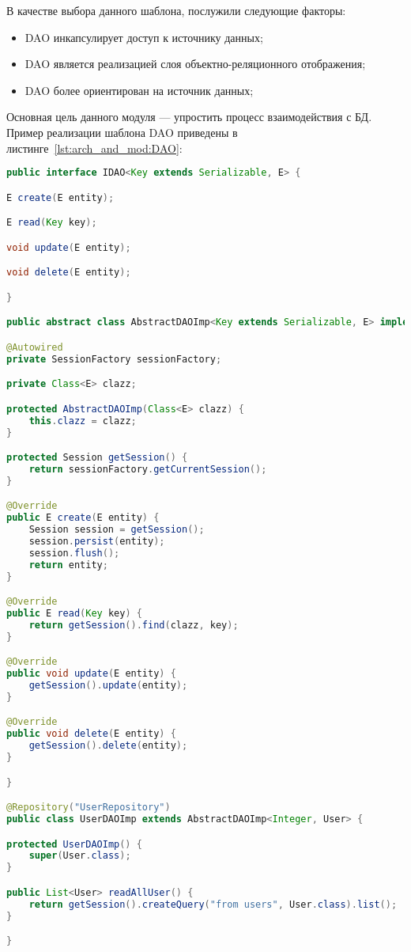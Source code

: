 В качестве выбора данного шаблона, послужили следующие факторы:

\begin{itemize}
	\item DAO инкапсулирует доступ к источнику данных;
	\item DAO является реализацией слоя объектно-реляционного отображения;
	\item DAO более ориентирован на источник данных;
\end{itemize}


Основная цель данного модуля --- упростить процесс взаимодействия с БД. Пример реализации шаблона DAO приведены в листинге~\ref{lst:arch_and_mod:DAO}:

\begin{lstlisting}[language=Java, style=rubystyle, caption={Определение для доступа к данным}, label=lst:arch_and_mod:DAO]
public interface IDAO<Key extends Serializable, E> {

E create(E entity);

E read(Key key);

void update(E entity);

void delete(E entity);

}

public abstract class AbstractDAOImp<Key extends Serializable, E> implements IDAO<Key, E> {

@Autowired
private SessionFactory sessionFactory;

private Class<E> clazz;

protected AbstractDAOImp(Class<E> clazz) {
	this.clazz = clazz;
}

protected Session getSession() {
	return sessionFactory.getCurrentSession();
}

@Override
public E create(E entity) {
	Session session = getSession();
	session.persist(entity);
	session.flush();
	return entity;
}

@Override
public E read(Key key) {
	return getSession().find(clazz, key);
}

@Override
public void update(E entity) {
	getSession().update(entity);
}

@Override
public void delete(E entity) {
	getSession().delete(entity);
}

}

@Repository("UserRepository")
public class UserDAOImp extends AbstractDAOImp<Integer, User> {

protected UserDAOImp() {
	super(User.class);
}

public List<User> readAllUser() {
	return getSession().createQuery("from users", User.class).list();
}

}
\end{lstlisting}


